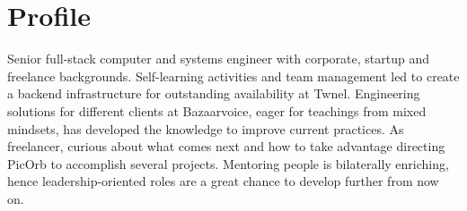 \section{Profile}
%
%
Senior full-stack computer and systems engineer with corporate, startup and
freelance backgrounds. Self-learning activities and team management led to create
a backend infrastructure for outstanding availability at Twnel. Engineering
solutions for different clients at Bazaarvoice, eager for teachings from mixed
mindsets, has developed the knowledge to improve current practices. As
freelancer, curious about what comes next and how to take advantage directing PicOrb to accomplish
several projects. Mentoring people is bilaterally enriching, hence
leadership-oriented roles are a great chance to develop further from now on.


